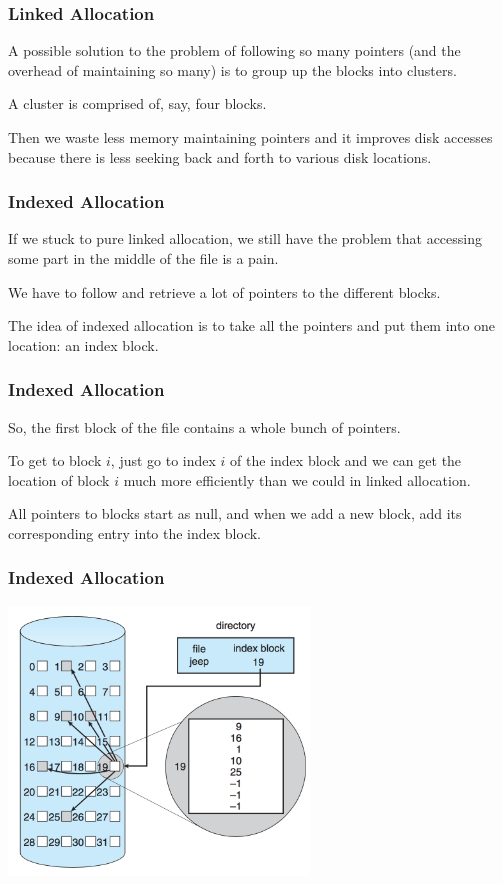 \begin{frame}
	\frametitle{Linked Allocation}

	A possible solution to the problem of following so many pointers (and the overhead of maintaining so many) is to group up the blocks into \alert{clusters}.

	A cluster is comprised of, say, four blocks.

	Then we waste less memory maintaining pointers and it improves disk accesses because there is less seeking back and forth to various disk locations.

\end{frame}

\begin{frame}
	\frametitle{Indexed Allocation}

	If we stuck to pure linked allocation, we still have the problem that accessing some part in the middle of the file is a pain.

	We have to follow and retrieve a lot of pointers to the different blocks.

	The idea of indexed allocation is to take all the pointers and put them into one location: an index block.


\end{frame}



\begin{frame}
	\frametitle{Indexed Allocation}

	So, the first block of the file contains a whole bunch of pointers.

	To get to block $i$, just go to index $i$ of the index block and we can get the location of block $i$ much more efficiently than we could in linked allocation.

	All pointers to blocks start as null, and when we add a new block, add its corresponding entry into the index block.

\end{frame}

\begin{frame}
	\frametitle{Indexed Allocation}

	\begin{center}
		\includegraphics[width=0.6\textwidth]{images/disk-indexed.png}
	\end{center}


\end{frame}

